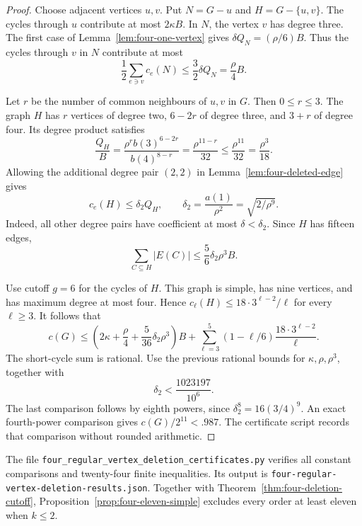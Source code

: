 \begin{proof}
Choose adjacent vertices $u,v$.
Put $N=G-u$ and $H=G-\{u,v\}$.
The cycles through $u$ contribute at most $2\kappa B$.
In $N$, the vertex $v$ has degree three.
The first case of Lemma~\ref{lem:four-one-vertex} gives $\delta Q_N=(\rho/6)B$.
Thus the cycles through $v$ in $N$ contribute at most
\[
 \frac12\sum_{e\ni v}c_e(N)\le\frac32\delta Q_N=\frac\rho4 B.
\]

Let $r$ be the number of common neighbours of $u,v$ in $G$.
Then $0\le r\le3$.
The graph $H$ has $r$ vertices of degree two, $6-2r$ of degree three, and $3+r$ of degree four.
Its degree product satisfies
\[
 \frac{Q_H}{B}
 =\frac{\rho^r b(3)^{6-2r}}{b(4)^{8-r}}
 =\frac{\rho^{11-r}}{32}
 \le\frac{\rho^{11}}{32}=\frac{\rho^3}{18}.
\]
Allowing the additional degree pair $(2,2)$ in Lemma~\ref{lem:four-deleted-edge} gives
\[
 c_e(H)\le\delta_2Q_H,\qquad
 \delta_2=\frac{a(1)}{\rho^2}=\sqrt{2/\rho^9}.
\]
Indeed, all other degree pairs have coefficient at most $\delta<\delta_2$.
Since $H$ has fifteen edges,
\[
 \sum_{C\subseteq H}|E(C)|\le\frac56\delta_2\rho^3B.
\]

Use cutoff $g=6$ for the cycles of $H$.
This graph is simple, has nine vertices, and has maximum degree at most four.
Hence $c_\ell(H)\le18\cdot3^{\ell-2}/\ell$ for every $\ell\ge3$.
It follows that
\[
 c(G)\le\left(2\kappa+\frac\rho4+
                   \frac5{36}\delta_2\rho^3\right)B
      +\sum_{\ell=3}^{5}(1-\ell/6)
                   \frac{18\cdot3^{\ell-2}}\ell.
\]
The short-cycle sum is rational.
Use the previous rational bounds for $\kappa,\rho,\rho^3$, together with
\[
 \delta_2<\frac{1023197}{10^6}.
\]
The last comparison follows by eighth powers, since $\delta_2^8=16(3/4)^9$.
An exact fourth-power comparison gives $c(G)/2^{11}<.987$.
The certificate script records that comparison without rounded arithmetic.
\end{proof}

The file \texttt{four\_regular\_vertex\_deletion\_certificates.py} verifies all constant comparisons and twenty-four finite inequalities.
Its output is \texttt{four-regular-vertex-deletion-results.json}.
Together with Theorem~\ref{thm:four-deletion-cutoff}, Proposition~\ref{prop:four-eleven-simple} excludes every order at least eleven when $k\le2$.
